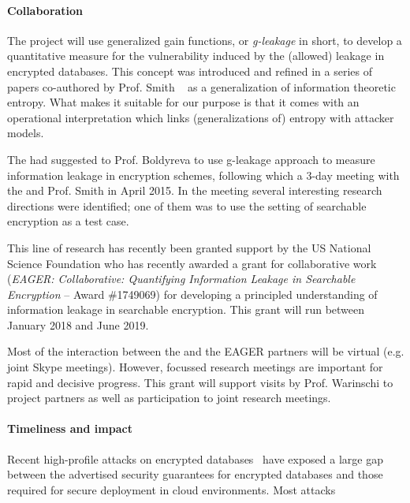 \paragraph{Collaboration}
The project will use generalized gain functions, or \emph{g-leakage} in short, to develop a quantitative measure for the vulnerability induced by the (allowed) leakage in encrypted databases. 
 This concept was introduced and refined in a series of papers co-authored by Prof. Smith ~\cite{DBLP:conf/csfw/AlvimCPS12,DBLP:conf/csfw/AlvimCMMPS14,DBLP:conf/csfw/AlvimCMMPS16,DBLP:conf/csfw/SmithS17} as 
a generalization of information theoretic entropy. 
What makes it suitable for our purpose is that it comes with an operational interpretation which links (generalizations of) entropy with attacker models. 


The \PI had suggested to Prof. Boldyreva to use g-leakage approach to measure information leakage in encryption schemes, following which a 3-day meeting with the \PI and Prof. Smith in April 2015.  In the meeting several interesting research directions were identified; one of them was to use the setting of searchable encryption as a test case. 

This line of research has recently been granted support by the US National Science Foundation who has recently awarded a grant for collaborative work (\textit{EAGER: Collaborative: Quantifying Information Leakage in Searchable Encryption} -- Award \#1749069) for developing a principled understanding of information leakage in searchable encryption. 
This grant will run between January 2018 and June 2019.  

Most of the interaction between the \PI and the EAGER partners will be virtual (e.g. joint Skype meetings).  
However, focussed research meetings are important for rapid and decisive progress.  
This grant will support visits by Prof. Warinschi to project partners as well as participation to joint research meetings. 

\paragraph{Timeliness and impact}
Recent high-profile attacks on encrypted databases~\cite{naveed2015inference,cash2015leakage} have exposed 
a large gap between the advertised security guarantees for encrypted databases and those required for secure deployment in cloud environments. 
Most attacks 

